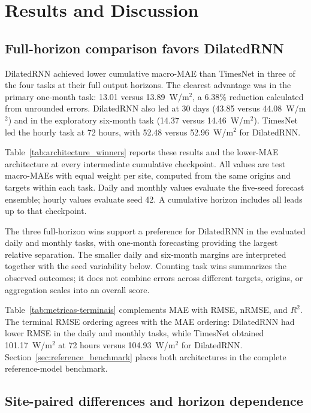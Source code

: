 \section{Results and Discussion}
\label{sec:results}

\subsection{Full-horizon comparison favors DilatedRNN}

DilatedRNN achieved lower cumulative macro-MAE than TimesNet in three of
the four tasks at their full output horizons. The clearest advantage was in
the primary one-month task: 13.01 versus 13.89~W/m$^2$, a
6.38\% reduction calculated from unrounded errors. DilatedRNN also led at
30 days (43.85 versus 44.08~W/m$^2$) and in the exploratory six-month task
(14.37 versus 14.46~W/m$^2$). TimesNet led the hourly task at
72 hours, with 52.48 versus 52.96~W/m$^2$ for DilatedRNN.

Table~\ref{tab:architecture_winners} reports these results and the lower-MAE
architecture at every intermediate cumulative checkpoint. All values are
test macro-MAEs with equal weight per site, computed from the same origins
and targets within each task. Daily and monthly values evaluate the
five-seed forecast ensemble; hourly values evaluate seed 42. A cumulative
horizon includes all leads up to that checkpoint.

The three full-horizon wins support a preference for DilatedRNN in the
evaluated daily and monthly tasks, with one-month forecasting providing the
largest relative separation. The smaller daily and six-month margins are
interpreted together with the seed variability below. Counting task wins
summarizes the observed outcomes; it does not combine errors across
different targets, origins, or aggregation scales into an overall score.



Table~\ref{tab:metricas-terminais} complements MAE with RMSE, nRMSE, and
$R^2$. The terminal RMSE ordering agrees with the MAE ordering:
DilatedRNN had lower RMSE in the daily and monthly tasks, while TimesNet
obtained 101.17~W/m$^2$ at 72 hours versus 104.93~W/m$^2$ for
DilatedRNN. Section~\ref{sec:reference_benchmark} places both architectures
in the complete reference-model benchmark.



\subsection{Site-paired differences and horizon dependence}

